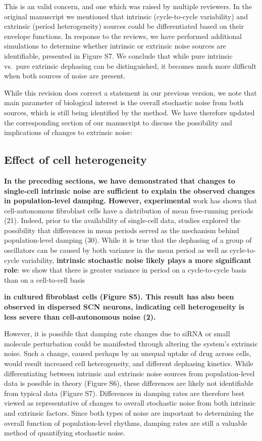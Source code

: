\documentclass[11pt, letterpaper]{article}
\newenvironment{manuscript}[1]{\begin{center}\begin{tcolorbox}[colback=green!5!white,colframe=green!75!black,width=\textwidth,title={#1},breakable,fonttitle=\bfseries]}{\end{tcolorbox}\end{center}}
\begin{document}
This is an valid concern, and one which was raised by multiple reviewers.
In the original manuscript we mentioned that intrinsic (cycle-to-cycle variability) and extrinsic (period heterogeneity) sources could be differentiated based on their envelope functions.
In response to the reviews, we have performed additional simulations to determine whether intrinsic or extrinsic noise sources are identifiable, presented in Figure S7.
We conclude that while pure intrinsic vs.\ pure extrinsic dephasing can be distinguished, it becomes much more difficult when both sources of noise are present.

While this revision does correct a statement in our previous version, we note that main parameter of biological interest is the overall stochastic noise from both sources, which is still being identified by the method.
We have therefore updated the corresponding section of our manuscript to discuss the possibility and implications of changes to extrinsic noise:

\begin{manuscript}{Page 8}
  \section*{Effect of cell heterogeneity}
  {\bfseries
In the preceding sections, we have demonstrated that changes to single-cell intrinsic noise are sufficient to explain the observed changes in population-level damping. 
However, experimental} work has shown that cell-autonomous fibroblast cells have a distribution of mean free-running periods (21). 
Indeed, prior to the availability of single-cell data, studies explored the possibility that differences in mean periods served as the mechanism behind population-level damping (30). 
While it is true that the dephasing of a group of oscillators can be caused by both variance in the mean period as well as cycle-to-cycle variability, {\bfseries intrinsic stochastic noise likely plays a more significant role}: we show that there is greater variance in period on a cycle-to-cycle basis than on a cell-to-cell basis {\bfseries in cultured fibroblast cells (Figure S5). 
This result has also been observed in dispersed SCN neurons, indicating cell heterogeneity is less severe than cell-autonomous noise (2).

However, it is possible that damping rate changes due to siRNA or small molecule perturbation could be manifested through altering the system's extrinsic noise. 
Such a change, caused perhaps by an unequal uptake of drug across cells, would result increased cell heterogeneity, and different dephasing kinetics. 
While differentiating between intrinsic and extrinsic noise sources from population-level data is possible in theory (Figure S6), these differences are likely not identifiable from typical data (Figure S7). 
Differences in damping rates are therefore best viewed as representative of changes to overall stochastic noise from both intrinsic and extrinsic factors. 
Since both types of noise are important to determining the overall function of population-level rhythms, damping rates are still a valuable method of quantifying stochastic noise.}
\end{manuscript}
\end{document}
